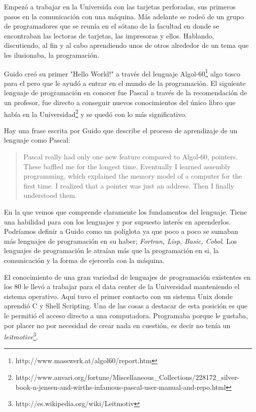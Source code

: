 \documentclass[11pt]{scrartcl}
\begin{document}
Empezó a trabajar en la Universida con las tarjetas perforadas, sus primeros pasos en la comunicación con una máquina. Más adelante se rodeó de un grupo de programadores que se reunía en el sótano de la facultad en donde se encontraban las lectoras de tarjetas, las impresoras y ellos. Hablando, discutiendo, al fin y al cabo aprendiendo unos de otros alrededor de un tema que les ilusionaba, la programación.

Guido creó su primer "Hello World!" a través del lenguaje Algol-60\footnote{http://www.masswerk.at/algol60/report.htm} algo tosco para el pero que le ayudó a entrar en el mundo de la programación. El siguiente lenguaje de programación en conocer fue Pascal a través de la recomendación de un profesor, fue directo a conseguir nuevos conocimientos del único libro que había en la Universidad\footnote{http://www.anvari.org/fortune/Miscellaneous\_Collections/228172\_silver-book-n-jensen-and-wirths-infamous-pascal-user-manual-and-repo.html} y se quedó con lo más significativo.

Hay una frase escrita por Guido que describe el proceso de aprendizaje de un lenguaje como Pascal:

\begin{quote}
    Pascal really had only one new feature compared to Algol-60, pointers. These baffled me for the longest time. Eventually I learned assembly programming, which explained the memory model of a computer for the first time. 
    I realized that a pointer was just an address. Then I finally understood them.
\end{quote}

En la que vemos que comprende claramente los fundamentos del lenguaje. Tiene una habilidad para con los lenguajes y por supuesto interés en aprenderlos. Podríamos definir a Guido como un políglota ya que poco a poco se sumaban más lenguajes de programación en su haber; \emph{Fortran, Lisp, Basic, Cobol}. Los lenguajes de programación le atraían más que la programación en si, la comunicación y la forma de ejercerla con la máquina.

El conocimiento de una gran variedad de lenguajes de programación existentes en los 80 le llevó a trabajar para el data center de la Universidad manteniendo el sistema operativo. Aquí tuvo el primer contacto con un sistema Unix donde aprendió C y Shell Scripting. Una de las cosas a destacar de esta posición es que le permitió el acceso directo a una computadora. Programaba porque le gustaba, por placer no por necesidad de crear nada en cuestión, es decir no tenía un \emph{leitmotive}\footnote{http://es.wikipedia.org/wiki/Leitmotiv}.
\end{document}
